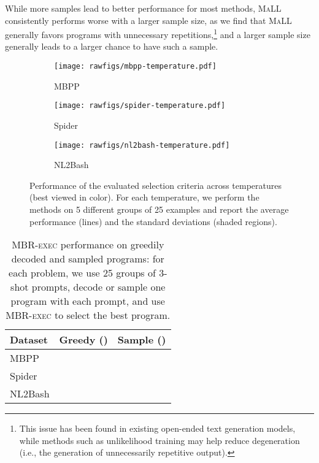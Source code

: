 \documentclass[11pt]{article}
\newcommand{\mbrexec}{\textsc{MBR-exec}\xspace}
\newcommand{\maxavglikelihood}{\textsc{MaLL}\xspace}
\begin{document}
While more samples lead to better performance for most methods, \maxavglikelihood consistently performs worse with a larger sample size, as we find that \maxavglikelihood generally favors programs with unnecessary repetitions,\footnote{This issue has been found in existing open-ended text generation models, while methods such as unlikelihood training \citep{Welleck2020Neural} may help reduce degeneration (i.e., the generation of unnecessarily repetitive output).} and a larger sample size generally leads to a larger chance to have such a sample.
 \begin{figure*}[t]
    \centering
    \begin{subfigure}[t]{0.34\textwidth}
        \texttt{[image: rawfigs/mbpp-temperature.pdf]}
        \caption{MBPP}
    \end{subfigure}
    \hspace{-10pt}
    \begin{subfigure}[t]{0.34\textwidth}
        \texttt{[image: rawfigs/spider-temperature.pdf]}
        \caption{Spider}
    \end{subfigure}
    \hspace{-10pt}
    \begin{subfigure}[t]{0.34\textwidth}
        \texttt{[image: rawfigs/nl2bash-temperature.pdf]}
        \caption{NL2Bash}
    \end{subfigure}
    \caption{Performance of the evaluated selection criteria across temperatures (best viewed in color). For each temperature, we perform the methods on 5 different groups of 25 examples and report the average performance (lines) and the standard deviations (shaded regions).}
    \label{fig:temperature}
\end{figure*} \begin{table}[t]
\centering
\small
\begin{tabular}{lcc}
    \toprule
    \textbf{Dataset} & \textbf{Greedy ()} & \textbf{Sample ()} \\
    \midrule
    MBPP    &     &  \\
    Spider  &     &  \\
    NL2Bash &     &  \\
    \bottomrule
\end{tabular}
\caption{
    \label{tab:0.3-vs-greedy} \mbrexec performance on greedily decoded and sampled programs: for each problem, we use 25 groups of 3-shot prompts, decode or sample one program with each prompt, and use \mbrexec to select the best program.
}
\end{table}
\end{document}
